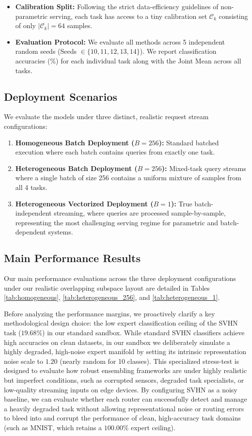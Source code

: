 \begin{itemize}
    \item \textbf{Calibration Split:} Following the strict data-efficiency guidelines of non-parametric serving, each task has access to a tiny calibration set $\mathcal{C}_k$ consisting of only $|\mathcal{C}_k| = 64$ samples.
    \item \textbf{Evaluation Protocol:} We evaluate all methods across 5 independent random seeds (Seeds $\in \{10, 11, 12, 13, 14\}$). We report classification accuracies (\%) for each individual task along with the Joint Mean across all tasks.
\end{itemize}

\subsection{Deployment Scenarios}
We evaluate the models under three distinct, realistic request stream configurations:
\begin{enumerate}
    \item \textbf{Homogeneous Batch Deployment ($B = 256$):} Standard batched execution where each batch contains queries from exactly one task.
    \item \textbf{Heterogeneous Batch Deployment ($B = 256$):} Mixed-task query streams where a single batch of size 256 contains a uniform mixture of samples from all 4 tasks.
    \item \textbf{Heterogeneous Vectorized Deployment ($B = 1$):} True batch-independent streaming, where queries are processed sample-by-sample, representing the most challenging serving regime for parametric and batch-dependent systems.
\end{enumerate}

\subsection{Main Performance Results}

Our main performance evaluations across the three deployment configurations under our realistic overlapping subspace layout are detailed in Tables \ref{tab:homogeneous}, \ref{tab:heterogeneous_256}, and \ref{tab:heterogeneous_1}. 

Before analyzing the performance margins, we proactively clarify a key methodological design choice: the low expert classification ceiling of the SVHN task ($19.68\%$) in our standard sandbox. While standard SVHN classifiers achieve high accuracies on clean datasets, in our sandbox we deliberately simulate a highly degraded, high-noise expert manifold by setting its intrinsic representation noise scale to $1.20$ (nearly random for 10 classes). This specialized stress-test is designed to evaluate how robust ensembling frameworks are under highly realistic but imperfect conditions, such as corrupted sensors, degraded task specialists, or low-quality streaming inputs on edge devices. By configuring SVHN as a noisy baseline, we can evaluate whether each router can successfully detect and manage a heavily degraded task without allowing representational noise or routing errors to bleed into and corrupt the performance of clean, high-accuracy task domains (such as MNIST, which retains a $100.00\%$ expert ceiling).

